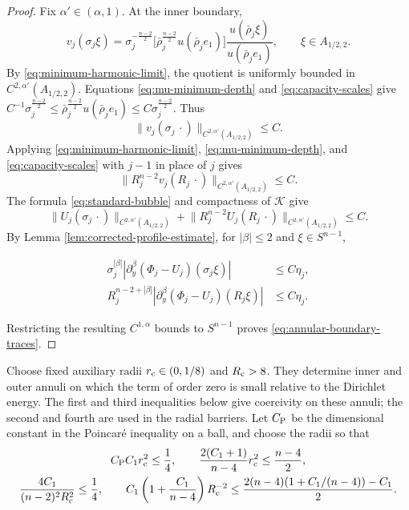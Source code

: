 \documentclass[11pt]{article}
\numberwithin{equation}{section}
\theoremstyle{remark}
\newcommand{\Sph}{S}
\newcommand{\norm}[1]{\lVert #1\rVert}
\begin{document}
\par
\begin{proof}
Fix \(\alpha'\in(\alpha,1)\). At the inner boundary,
\[
 v_j(\sigma_j\xi)=\sigma_j^{-\frac{n-2}{2}}
 \bigl[\bar\rho_j^{\frac{n-2}{2}}u(\bar\rho_je_1)\bigr]
 \frac{u(\bar\rho_j\xi)}{u(\bar\rho_je_1)},
 \qquad \xi\in A_{1/2,2}.
\]
By \eqref{eq:minimum-harmonic-limit}, the quotient is uniformly bounded in
\(C^{2,\alpha'}(A_{1/2,2})\). Equations
\eqref{eq:mu-minimum-depth} and \eqref{eq:capacity-scales} give
\(C^{-1}\sigma_j^{\frac{n-2}{2}}\le\bar\rho_j^{\frac{n-2}{2}}u(\bar\rho_je_1)\le C\sigma_j^{\frac{n-2}{2}}\).
Thus
\[
 \norm{v_j(\sigma_j\,\cdot)}_{C^{2,\alpha'}(A_{1/2,2})}\le C.
\]
Applying \eqref{eq:minimum-harmonic-limit},
\eqref{eq:mu-minimum-depth}, and \eqref{eq:capacity-scales} with \(j-1\)
in place of \(j\) gives
\[
 \norm{R_j^{n-2}v_j(R_j\,\cdot)}_{C^{2,\alpha'}(A_{1/2,2})}\le C.
\]
The formula \eqref{eq:standard-bubble} and compactness of \(\mathcal K\)
give
\[
 \norm{U_j(\sigma_j\,\cdot)}_{C^{2,\alpha'}(A_{1/2,2})}
 +\norm{R_j^{n-2}U_j(R_j\,\cdot)}_{C^{2,\alpha'}(A_{1/2,2})}
 \le C.
\]
By Lemma  \ref{lem:corrected-profile-estimate}, for
\(|\beta|\le2\) and \(\xi\in\Sph^{n-1}\),
 
\[
 \begin{aligned}
 \sigma_j^{|\beta|}
 |\partial_y^\beta(\Phi_j-U_j)(\sigma_j\xi)|
 &\le C\eta_j,\\
 R_j^{n-2+|\beta|}
 |\partial_y^\beta(\Phi_j-U_j)(R_j\xi)|
 &\le C\eta_j.
 \end{aligned}
\]

 Restricting the resulting \(C^{1,\alpha}\) bounds to \(\Sph^{n-1}\)
proves \eqref{eq:annular-boundary-traces}.
\end{proof}

\par

Choose fixed auxiliary radii \(r_{\rm c}\in(0,1/8)\) and
\(R_{\rm c}>8\). They determine inner and outer annuli on which the
term of order zero is small relative to the Dirichlet energy. The first
and third inequalities below give coercivity on these annuli; the second
and fourth are used in the radial barriers. Let \(C_{\rm P}\) be the
dimensional constant in the Poincar\'e inequality on a ball, and choose
the radii so that
\begin{equation}\label{eq:boundary-radius-choice}
 \begin{gathered}
 C_{\rm P}C_1r_{\rm c}^2\le\frac14,
 \qquad
 \frac{2(C_1+1)}{n-4}r_{\rm c}^2\le\frac{n-4}{2},\\
 \frac{4C_1}{(n-2)^2R_{\rm c}^2}\le\frac14,
 \qquad
 C_1\left(1+\frac{C_1}{n-4}\right)R_{\rm c}^{-2}
 \le\frac{2(n-4)(1+C_1/(n-4))-C_1}{2}.
 \end{gathered}
\end{equation}
\end{document}
